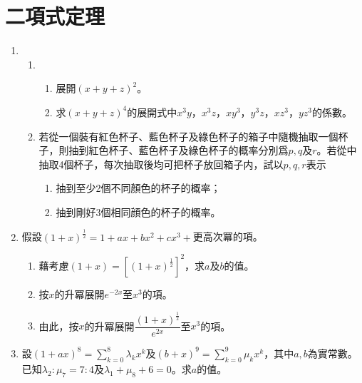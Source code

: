 \documentclass[12pt]{article}
\begin{document}
    \tableofcontents

    \newpage

    \section{二項式定理}

    \begin{enumerate}
        \item \begin{enumerate}
            \item \begin{enumerate}
                \item 展開$(x+y+z)^2$。
                \item 求$(x+y+z)^4$的展開式中$x^3y$，$x^3z$，$xy^3$，$y^3z$，$xz^3$，$yz^3$的係數。
            \end{enumerate}
            \item 若從一個裝有紅色杯子、藍色杯子及綠色杯子的箱子中隨機抽取一個杯子，則抽到紅色杯子、藍色杯子及綠色杯子的概率分別爲$p,q$及$r$。若從中抽取4個杯子，每次抽取後均可把杯子放回箱子内，試以$p,q,r$表示\begin{enumerate}
                \item 抽到至少2個不同顏色的杯子的概率；
                \item 抽到剛好3個相同顔色的杯子的概率。
            \end{enumerate}
        \end{enumerate}
        \item 假設$(1+x)^{\frac{1}{2}}=1+ax+bx^2+cx^3+$更高次冪的項。\begin{enumerate}
            \item 藉考慮$(1+x)=[(1+x)^{\frac{1}{2}}]^2$，求$a$及$b$的值。
            \item 按$x$的升冪展開$e^{-2x}$至$x^3$的項。
            \item 由此，按$x$的升冪展開$\dfrac{(1+x)^{\frac{1}{2}}}{e^{2x}}$至$x^3$的項。
        \end{enumerate}
        \item 設$(1+ax)^8=\displaystyle\sum_{k=0}^{8}\lambda_k x^k$及$(b+x)^9=\displaystyle\sum_{k=0}^{9}\mu_k x^k$，其中$a,b$為實常數。已知$\lambda_2:\mu_7=7:4$及$\lambda_1+\mu_8+6=0$。求$a$的值。
    \end{enumerate}
\end{document}
